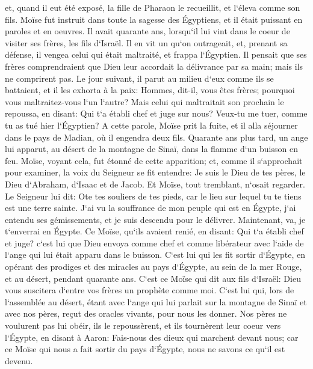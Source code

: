 \verse et, quand il eut été exposé, la fille de Pharaon le recueillit, et l`éleva comme son fils. 
\verse Moïse fut instruit dans toute la sagesse des Égyptiens, et il était puissant en paroles et en oeuvres. 
\verse Il avait quarante ans, lorsqu`il lui vint dans le coeur de visiter ses frères, les fils d`Israël. 
\verse Il en vit un qu`on outrageait, et, prenant sa défense, il vengea celui qui était maltraité, et frappa l`Égyptien. 
\verse Il pensait que ses frères comprendraient que Dieu leur accordait la délivrance par sa main; mais ils ne comprirent pas. 
\verse Le jour suivant, il parut au milieu d`eux comme ils se battaient, et il les exhorta à la paix: Hommes, dit-il, vous êtes frères; pourquoi vous maltraitez-vous l`un l`autre? 
\verse Mais celui qui maltraitait son prochain le repoussa, en disant: Qui t`a établi chef et juge sur nous? 
\verse Veux-tu me tuer, comme tu as tué hier l`Égyptien? 
\verse A cette parole, Moïse prit la fuite, et il alla séjourner dans le pays de Madian, où il engendra deux fils. 
\verse Quarante ans plus tard, un ange lui apparut, au désert de la montagne de Sinaï, dans la flamme d`un buisson en feu. 
\verse Moïse, voyant cela, fut étonné de cette apparition; et, comme il s`approchait pour examiner, la voix du Seigneur se fit entendre: 
\verse Je suis le Dieu de tes pères, le Dieu d`Abraham, d`Isaac et de Jacob. Et Moïse, tout tremblant, n`osait regarder. 
\verse Le Seigneur lui dit: Ote tes souliers de tes pieds, car le lieu sur lequel tu te tiens est une terre sainte. 
\verse J`ai vu la souffrance de mon peuple qui est en Égypte, j`ai entendu ses gémissements, et je suis descendu pour le délivrer. Maintenant, va, je t`enverrai en Égypte. 
\verse Ce Moïse, qu`ils avaient renié, en disant: Qui t`a établi chef et juge? c`est lui que Dieu envoya comme chef et comme libérateur avec l`aide de l`ange qui lui était apparu dans le buisson. 
\verse C`est lui qui les fit sortir d`Égypte, en opérant des prodiges et des miracles au pays d`Égypte, au sein de la mer Rouge, et au désert, pendant quarante ans. 
\verse C`est ce Moïse qui dit aux fils d`Israël: Dieu vous suscitera d`entre vos frères un prophète comme moi. 
\verse C`est lui qui, lors de l`assemblée au désert, étant avec l`ange qui lui parlait sur la montagne de Sinaï et avec nos pères, reçut des oracles vivants, pour nous les donner. 
\verse Nos pères ne voulurent pas lui obéir, ils le repoussèrent, et ils tournèrent leur coeur vers l`Égypte, 
\verse en disant à Aaron: Fais-nous des dieux qui marchent devant nous; car ce Moïse qui nous a fait sortir du pays d`Égypte, nous ne savons ce qu`il est devenu. 
